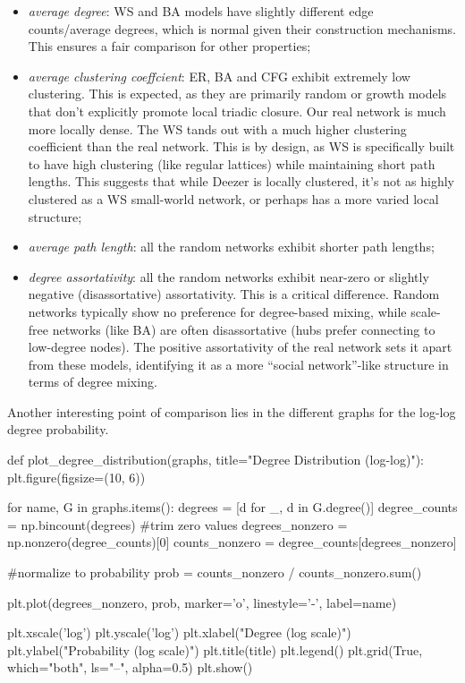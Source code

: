 \documentclass[12pt]{article}
\begin{document}
\begin{itemize}
	\item \textit{average degree}: WS and BA models have slightly different edge counts/average degrees, which is normal given their construction mechanisms. This ensures a fair comparison for other properties;
	\item \textit{average clustering coeffcient}: ER, BA and CFG exhibit extremely low clustering. This is expected, as they are primarily random or growth models that don't explicitly promote local triadic closure. Our real network is much more locally dense. The WS tands out with a much higher clustering coefficient than the real network. This is by design, as WS is specifically built to have high clustering (like regular lattices) while maintaining short path lengths. This suggests that while Deezer is locally clustered, it's not as highly clustered as a WS small-world network, or perhaps has a more varied local structure;
	\item \textit{average path length}: all the random networks exhibit shorter path lengths;
	\item \textit{degree assortativity}: all the random networks exhibit near-zero or slightly negative (disassortative) assortativity. This is a critical difference. Random networks typically show no preference for degree-based mixing, while scale-free networks (like BA) are often disassortative (hubs prefer connecting to low-degree nodes). The positive assortativity of the real network sets it apart from these models, identifying it as a more ``social network''-like structure in terms of degree mixing.
\end{itemize}
Another interesting point of comparison lies in the different graphs for the log-log degree probability.
\begin{py}
	def plot_degree_distribution(graphs, title="Degree Distribution (log-log)"):
		plt.figure(figsize=(10, 6))
		
		for name, G in graphs.items():
			degrees = [d for _, d in G.degree()]
			degree_counts = np.bincount(degrees)
			#trim zero values
			degrees_nonzero = np.nonzero(degree_counts)[0]
			counts_nonzero = degree_counts[degrees_nonzero]
			
			#normalize to probability
			prob = counts_nonzero / counts_nonzero.sum()
			
			plt.plot(degrees_nonzero, prob, marker='o', linestyle='-', label=name)
		
		plt.xscale('log')
		plt.yscale('log')
		plt.xlabel("Degree (log scale)")
		plt.ylabel("Probability (log scale)")
		plt.title(title)
		plt.legend()
		plt.grid(True, which="both", ls="--", alpha=0.5)
		plt.show()
\end{py}
\end{document}
